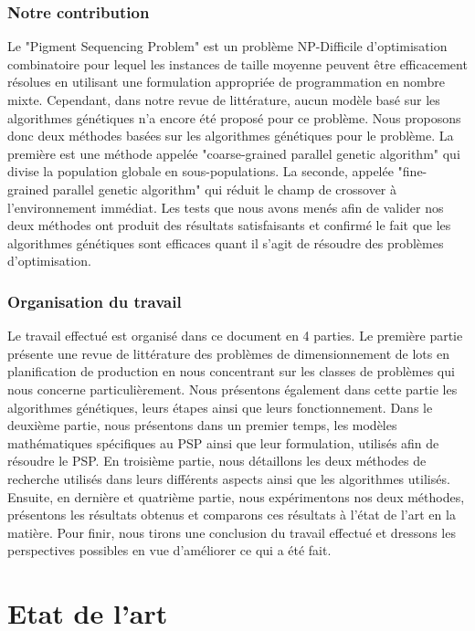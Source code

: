 \documentclass[12pt,a4paper]{article}
\begin{document}
	\section*{Notre contribution}
	Le "Pigment Sequencing Problem" est un problème NP-Difficile d'optimisation combinatoire pour lequel les instances de taille moyenne peuvent être efficacement résolues en utilisant une formulation appropriée de programmation en nombre mixte. Cependant, dans notre revue de littérature, aucun modèle basé sur les algorithmes génétiques n'a encore été proposé pour ce problème. Nous proposons donc deux méthodes basées sur les algorithmes génétiques pour le problème. La première est une méthode appelée "coarse-grained parallel genetic algorithm" qui divise la population globale en sous-populations. La seconde, appelée "fine-grained parallel genetic algorithm" qui réduit le champ de crossover à l'environnement immédiat. Les tests que nous avons menés afin de valider nos deux méthodes ont produit des résultats satisfaisants et confirmé le fait que les algorithmes génétiques sont efficaces quant il s'agit de résoudre des problèmes d'optimisation. 
	 
	\section*{Organisation du travail}

	Le travail effectué est organisé dans ce document en 4 parties. Le première partie présente une revue de littérature des problèmes de dimensionnement de lots en planification de production en nous concentrant sur les classes de problèmes qui nous concerne particulièrement. Nous présentons également dans cette partie les algorithmes génétiques, leurs étapes ainsi que leurs fonctionnement. Dans le deuxième partie, nous présentons dans un premier temps, les modèles mathématiques spécifiques au PSP ainsi que leur formulation, utilisés afin de résoudre le PSP. En troisième partie, nous détaillons les deux méthodes de recherche utilisés dans leurs différents aspects ainsi que les algorithmes utilisés. Ensuite, en dernière et quatrième partie, nous expérimentons  nos deux méthodes, présentons les résultats obtenus et comparons ces résultats à l'état de l'art en la matière. Pour finir, nous tirons une conclusion du travail effectué et dressons les perspectives possibles en vue d'améliorer ce qui a été fait.
	
	\newpage
	
	\part{Etat de l'art}
\end{document}
